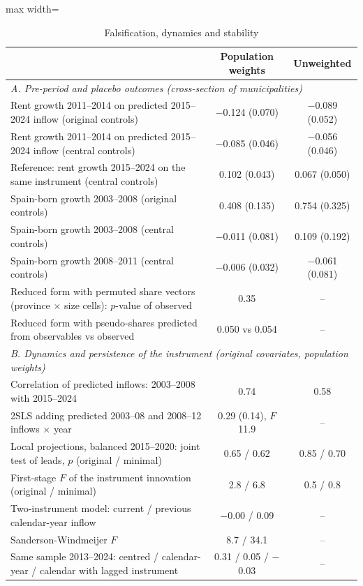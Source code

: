 \begin{table}[!htbp]\centering\small
\caption{Falsification, dynamics and stability}\label{tab:falsification}
\begin{adjustbox}{max width=\linewidth}\begin{tabular}{lcc}\toprule
 & Population weights & Unweighted \\ \midrule
\multicolumn{3}{l}{\textit{A. Pre-period and placebo outcomes (cross-section of municipalities)}}\\
Rent growth 2011--2014 on predicted 2015--2024 inflow (original controls) & $-$0.124 (0.070) & $-$0.089 (0.052)\\
Rent growth 2011--2014 on predicted 2015--2024 inflow (central controls) & $-$0.085 (0.046) & $-$0.056 (0.046)\\
\quad Reference: rent growth 2015--2024 on the same instrument (central controls) & 0.102 (0.043) & 0.067 (0.050)\\
Spain-born growth 2003--2008 (original controls) & 0.408 (0.135) & 0.754 (0.325)\\
Spain-born growth 2003--2008 (central controls) & $-$0.011 (0.081) & 0.109 (0.192)\\
Spain-born growth 2008--2011 (central controls) & $-$0.006 (0.032) & $-$0.061 (0.081)\\
Reduced form with permuted share vectors (province $\times$ size cells): $p$-value of observed & 0.35 & --\\
Reduced form with pseudo-shares predicted from observables vs observed & 0.050 vs 0.054 & --\\
\midrule\multicolumn{3}{l}{\textit{B. Dynamics and persistence of the instrument (original covariates, population weights)}}\\
Correlation of predicted inflows: 2003--2008 with 2015--2024 & 0.74 & 0.58\\
2SLS adding predicted 2003--08 and 2008--12 inflows $\times$ year & 0.29 (0.14), $F$ 11.9 & --\\
Local projections, balanced 2015--2020: joint test of leads, $p$ (original / minimal) & 0.65 / 0.62 & 0.85 / 0.70\\
\quad First-stage $F$ of the instrument innovation (original / minimal) & 2.8 / 6.8 & 0.5 / 0.8\\
Two-instrument model: current / previous calendar-year inflow & $-$0.00 / 0.09 & --\\
\quad Sanderson-Windmeijer $F$ & 8.7 / 34.1 & --\\
Same sample 2013--2024: centred / calendar-year / calendar with lagged instrument & 0.31 / 0.05 / $-$0.03 & --\\

\end{tabular}
\end{adjustbox}
\end{table}
